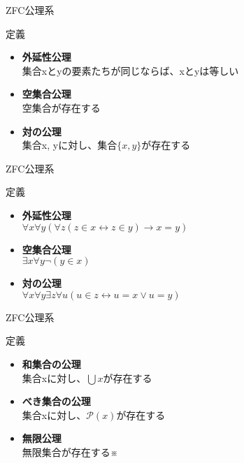 \documentclass[17pt,aspectratio=169,xcolor=dvipsnames,table,dvipdfmx]{beamer}
\theoremstyle{definition}
\begin{document}
\begin{frame}{ZFC公理系}
    \begin{block}{定義}
        \begin{itemize}
            \item \textbf{外延性公理} \\
                  集合xとyの要素たちが同じならば、xとyは等しい
            \item \textbf{空集合公理} \\
                  空集合が存在する
            \item \textbf{対の公理} \\
                  集合x, yに対し、集合$\{x, y\}$が存在する
        \end{itemize}
    \end{block}
\end{frame}

\begin{frame}{ZFC公理系}
    \begin{block}{定義}
        \begin{itemize}
            \item \textbf{外延性公理} \\
                  $\forall x \forall y (\forall z (z \in x \leftrightarrow z \in y) \rightarrow x = y)$
            \item \textbf{空集合公理} \\
                  $\exists x \forall y \neg (y \in x)$
            \item \textbf{対の公理} \\
                  $\forall x \forall y \exists z \forall u (u \in z \leftrightarrow u = x \lor u = y)$
        \end{itemize}
    \end{block}
\end{frame}

\begin{frame}{ZFC公理系}
    \begin{block}{定義}
        \begin{itemize}
            \item \textbf{和集合の公理} \\
                  集合xに対し、$\bigcup x$が存在する
            \item \textbf{べき集合の公理} \\
                  集合xに対し、$\mathcal{P}(x)$が存在する
            \item \textbf{無限公理} \\
                  無限集合が存在する※
        \end{itemize}
    \end{block}
\end{frame}
\end{document}
